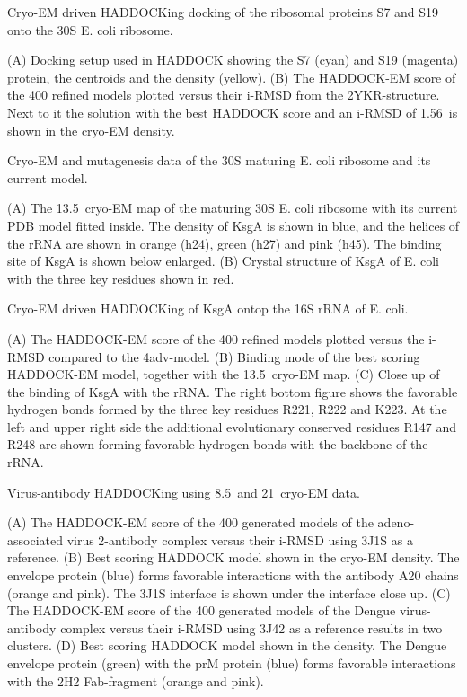 \caption{Cryo-EM driven HADDOCKing docking of the ribosomal proteins S7 and S19
onto the 30S E. coli ribosome.} 
{(A) Docking setup used in HADDOCK showing the S7 (cyan) and S19 (magenta)
protein, the centroids and the density (yellow). 
(B) The HADDOCK-EM score of the 400 refined models plotted versus their i-RMSD
from the 2YKR-structure. Next to it the solution with the best HADDOCK score
and an i-RMSD of 1.56\Angstrom\ is shown in the cryo-EM density.} 
\stopbuffer


\caption{Cryo-EM and mutagenesis data of the 30S maturing E. coli ribosome and
its current model.}
{(A) The 13.5\Angstrom\ cryo-EM map of the maturing 30S E. coli ribosome with its
current PDB model fitted inside. The density of KsgA is shown in blue, and the
helices of the rRNA are shown in orange (h24), green (h27) and pink (h45). The
binding site of KsgA is shown below enlarged.
(B) Crystal structure of KsgA of E. coli with the three key residues shown in
red.}
\stopbuffer


\caption{Cryo-EM driven HADDOCKing of KsgA ontop the 16S rRNA of E. coli.}
{(A) The HADDOCK-EM score of the 400 refined models plotted versus the i-RMSD
compared to the 4adv-model. 
(B) Binding mode of the best scoring HADDOCK-EM model, together with the 13.5\Angstrom\
cryo-EM map.
(C) Close up of the binding of KsgA with the rRNA. The right bottom figure
shows the favorable hydrogen bonds formed by the three key residues R221, R222
and K223. At the left and upper right side the additional evolutionary
conserved residues R147 and R248 are shown forming favorable hydrogen bonds
with the backbone of the rRNA.}
\stopbuffer


\caption{Virus-antibody HADDOCKing using 8.5\Angstrom\ and 21\Angstrom\ cryo-EM
data.}
{ (A) The HADDOCK-EM score of the 400 generated models of the adeno-associated
virus 2-antibody complex versus their i-RMSD using 3J1S as a reference.
(B) Best scoring HADDOCK model shown in the cryo-EM density. The envelope
protein (blue) forms favorable interactions with the antibody A20 chains
(orange and pink). The 3J1S interface is shown under the interface close up. 
(C) The HADDOCK-EM score of the 400 generated models of the Dengue
virus-antibody complex versus their i-RMSD using 3J42 as a reference results
in two clusters.
(D) Best scoring HADDOCK model shown in the density. The Dengue
envelope protein (green) with the prM protein (blue) forms favorable
interactions with the 2H2 Fab-fragment (orange and pink).}
\stopbuffer


